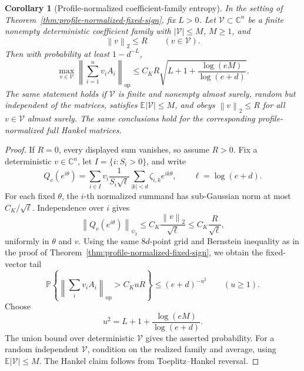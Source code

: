 \documentclass[11pt]{amsart}
\numberwithin{equation}{section}
\newtheorem{corollary}[theorem]{Corollary}
\theoremstyle{definition}
\theoremstyle{remark}
\newcommand{\op}{\mathrm{op}}
\newcommand{\Prob}{\mathbb P}
\newcommand{\Exp}{\mathbb E}
\newcommand{\norm}[1]{\left\lVert #1\right\rVert}
\newcommand{\abs}[1]{\left\lvert #1\right\rvert}
\begin{document}
\begin{corollary}[Profile-normalized coefficient-family entropy]
\label{cor:profile-normalized-coefficient-entropy}
In the setting of Theorem~\ref{thm:profile-normalized-fixed-sign}, fix
\(L>0\).  Let \(\mathcal V\subset\mathbb C^n\) be a finite nonempty deterministic
coefficient family with \(\abs{\mathcal V}\le M\), \(M\ge1\), and
\[
  \norm{v}_2\le R\qquad(v\in\mathcal V).
\]
Then with probability at least \(1-d^{-L}\),
\[
  \max_{v\in\mathcal V}
  \norm{\sum_{i=1}^n v_iA_i}_{\op}
  \le
  C_K R\sqrt{L+1+\frac{\log(eM)}{\log(e+d)}} .
\]
The same statement holds if \(\mathcal V\) is finite and nonempty almost
surely, random but independent of the matrices, satisfies
\(\Exp\abs{\mathcal V}\le M\), and obeys \(\norm{v}_2\le R\) for all
\(v\in\mathcal V\) almost surely.  The same
conclusions hold for the corresponding profile-normalized full Hankel
matrices.
\end{corollary}

\begin{proof}
If \(R=0\), every displayed sum vanishes, so assume \(R>0\).  Fix a
deterministic \(v\in\mathbb C^n\), let \(I=\{i:S_i>0\}\), and write
\[
  Q_v(e^{i\theta})
  =
  \sum_{i\in I}v_i\frac1{S_i\sqrt{\ell}}
  \sum_{|k|<d}\zeta_{i,k}e^{ik\theta},
  \qquad \ell=\log(e+d).
\]
For each fixed \(\theta\), the \(i\)-th normalized summand has sub-Gaussian
norm at most \(C_K/\sqrt{\ell}\).  Independence over \(i\) gives
\[
  \norm{Q_v(e^{i\theta})}_{\psi_2}
  \le C_K\frac{\norm{v}_2}{\sqrt{\ell}}
  \le C_K\frac R{\sqrt{\ell}},
\]
uniformly in \(\theta\) and \(v\).  Using the same \(8d\)-point grid and
Bernstein inequality as in the proof of
Theorem~\ref{thm:profile-normalized-fixed-sign}, we obtain the fixed-vector
tail
\[
  \Prob\left\{
  \norm{\sum_i v_iA_i}_{\op}>C_KuR
  \right\}
  \le (e+d)^{-u^2}
  \qquad(u\ge1).
\]
Choose
\[
  u^2=L+1+\frac{\log(eM)}{\log(e+d)} .
\]
The union bound over deterministic \(\mathcal V\) gives the asserted
probability.  For a random independent \(\mathcal V\), condition on the
realized family and average, using \(\Exp\abs{\mathcal V}\le M\).  The Hankel
claim follows from Toeplitz--Hankel reversal.
\end{proof}
\end{document}
